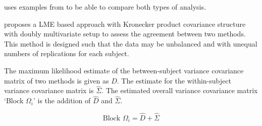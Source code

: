 \documentclass[12pt, a4paper]{report}
\theoremstyle{plain}
\theoremstyle{definition}
\theoremstyle{remark}
\begin{document}
\citet{ARoy2009} uses examples from \citet{BA86} to be able to
compare both types of analysis.

\citet{ARoy2009} proposes a LME based approach with Kronecker
product covariance structure with doubly multivariate setup to
assess the agreement between two methods. This method is designed
such that the data may be unbalanced and with unequal numbers of
replications for each subject.

The maximum likelihood estimate of the between-subject variance
covariance matrix of two methods is given as $D$. The estimate for
the within-subject variance covariance matrix is $\hat{\Sigma}$.
The estimated overall variance covariance matrix `Block
$\Omega_{i}$' is the addition of $\hat{D}$ and $\hat{\Sigma}$.


\begin{equation}
	\mbox{Block  }\Omega_{i} = \hat{D} + \hat{\Sigma}
\end{equation}





\end{document}
